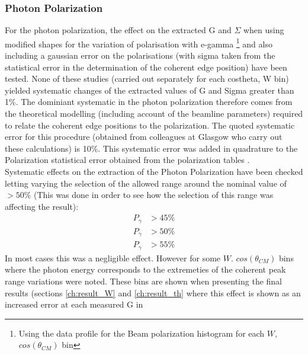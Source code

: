 \subsubsection{Photon Polarization}\label{sec:ph_pol_sys}
For the photon polarization, the effect on the extracted G and $\Sigma$ when using modified shapes for the variation of polarisation with e-gamma \footnote{Using the data profile for the Beam polarization histogram for each $W$, $cos(\theta_{CM})$ bin} and also including a gaussian error on the polarisations (with sigma taken from the statistical error in the determination of the coherent edge position) have been tested. None of these studies (carried out separately for each costheta, W bin) yielded systematic changes of the extracted values of G and Sigma greater than 1\%. The dominiant systematic in the photon polarization therefore comes from the theoretical modelling (including account of the beamline parameters) required to relate the coherent edge positions to the polarization. The quoted systematic error for this procedure (obtained from colleagues at Glasgow who carry out these calculations) is 10\%.
 This systematic error was added in quadrature to the Polarization statistical error obtained from the polarization tables \cite{Anderson_table}. \\
Systematic effects on the extraction of the Photon Polarization have been checked letting varying the selection of the allowed range around the nominal value of $>50\%$ (This was done in order to see how the selection of this range was affecting the result):
\begin{align}
  P_\gamma &> 45 \% \\
  P_\gamma &> 50 \% \\
  P_\gamma &> 55 \% 
\end{align}
In most cases this was a negligible effect. However for some $W$. $cos(\theta_{CM})$ bins where the photon energy corresponds to the extremeties of the coherent peak range variations were noted. These bins are shown when presenting the final results (sections \ref{ch:result_W} and \ref{ch:result_th} where this effect is shown as an increased error at each measured G in \color{red}{red}\color{black}{)} 


